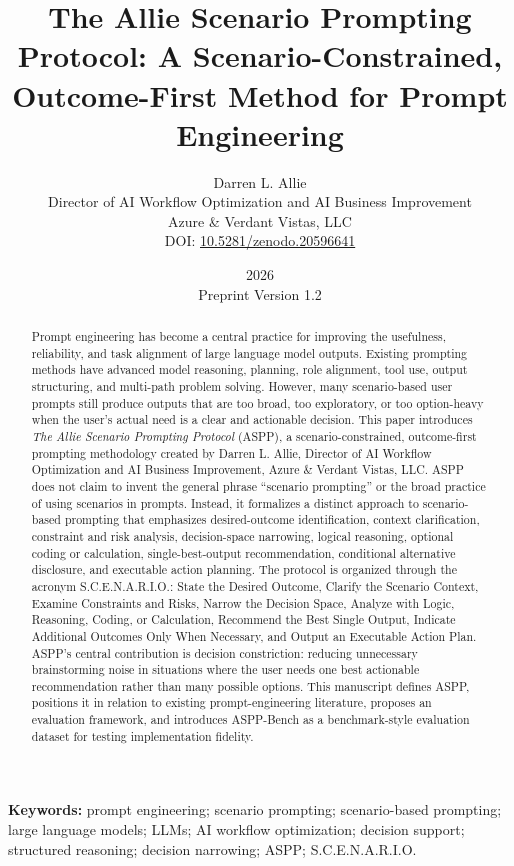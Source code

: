 \documentclass[11pt]{article}
\title{\textbf{The Allie Scenario Prompting Protocol: A Scenario-Constrained, Outcome-First Method for Prompt Engineering}}
\author{
Darren L. Allie\\
Director of AI Workflow Optimization and AI Business Improvement\\
Azure \& Verdant Vistas, LLC\\
DOI: \href{https://doi.org/10.5281/zenodo.20596641}{10.5281/zenodo.20596641}
}
\date{2026\\Preprint Version 1.2}
\begin{document}
\maketitle

\begin{abstract}
Prompt engineering has become a central practice for improving the usefulness, reliability, and task alignment of large language model outputs. Existing prompting methods have advanced model reasoning, planning, role alignment, tool use, output structuring, and multi-path problem solving. However, many scenario-based user prompts still produce outputs that are too broad, too exploratory, or too option-heavy when the user's actual need is a clear and actionable decision. This paper introduces \textit{The Allie Scenario Prompting Protocol} (ASPP), a scenario-constrained, outcome-first prompting methodology created by Darren L. Allie, Director of AI Workflow Optimization and AI Business Improvement, Azure \& Verdant Vistas, LLC. ASPP does not claim to invent the general phrase ``scenario prompting'' or the broad practice of using scenarios in prompts. Instead, it formalizes a distinct approach to scenario-based prompting that emphasizes desired-outcome identification, context clarification, constraint and risk analysis, decision-space narrowing, logical reasoning, optional coding or calculation, single-best-output recommendation, conditional alternative disclosure, and executable action planning. The protocol is organized through the acronym S.C.E.N.A.R.I.O.: State the Desired Outcome, Clarify the Scenario Context, Examine Constraints and Risks, Narrow the Decision Space, Analyze with Logic, Reasoning, Coding, or Calculation, Recommend the Best Single Output, Indicate Additional Outcomes Only When Necessary, and Output an Executable Action Plan. ASPP's central contribution is decision constriction: reducing unnecessary brainstorming noise in situations where the user needs one best actionable recommendation rather than many possible options. This manuscript defines ASPP, positions it in relation to existing prompt-engineering literature, proposes an evaluation framework, and introduces ASPP-Bench as a benchmark-style evaluation dataset for testing implementation fidelity.
\end{abstract}

\noindent\textbf{Keywords:} prompt engineering; scenario prompting; scenario-based prompting; large language models; LLMs; AI workflow optimization; decision support; structured reasoning; decision narrowing; ASPP; S.C.E.N.A.R.I.O.
\end{document}

